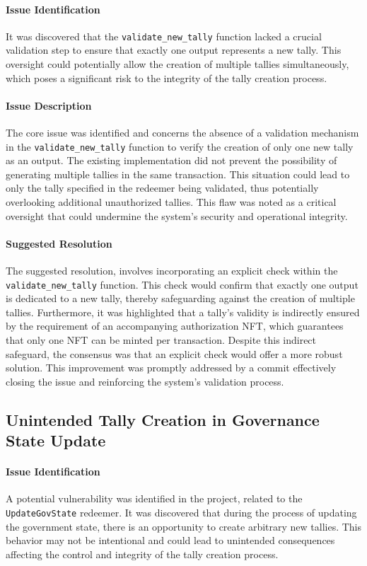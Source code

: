 \documentclass[11pt]{article}
\begin{document}
\paragraph{Issue Identification}
It was discovered that the \texttt{validate\_new\_tally} function lacked a crucial validation step to ensure that exactly one output represents a new tally.
This oversight could potentially allow the creation of multiple tallies simultaneously, which poses a significant risk to the integrity of the tally creation process.

\paragraph{Issue Description}
The core issue was identified and concerns the absence of a validation mechanism in the \texttt{validate\_new\_tally} function to verify the creation of only one new tally as an output.
The existing implementation did not prevent the possibility of generating multiple tallies in the same transaction.
This situation could lead to only the tally specified in the redeemer being validated, thus potentially overlooking additional unauthorized tallies.
This flaw was noted as a critical oversight that could undermine the system's security and operational integrity.

\paragraph{Suggested Resolution}
The suggested resolution, involves incorporating an explicit check within the \texttt{validate\_new\_tally} function.
This check would confirm that exactly one output is dedicated to a new tally, thereby safeguarding against the creation of multiple tallies.
Furthermore, it was highlighted that a tally's validity is indirectly ensured by the requirement of an accompanying authorization NFT, which guarantees that only one NFT can be minted per transaction.
Despite this indirect safeguard, the consensus was that an explicit check would offer a more robust solution.
This improvement was promptly addressed by a commit effectively closing the issue and reinforcing the system's validation process.

\subsection{Unintended Tally Creation in Governance State Update}

\paragraph{Issue Identification}
A potential vulnerability was identified in the project, related to the \texttt{UpdateGovState} redeemer.
It was discovered that during the process of updating the government state, there is an opportunity to create arbitrary new tallies.
This behavior may not be intentional and could lead to unintended consequences affecting the control and integrity of the tally creation process.
\end{document}

